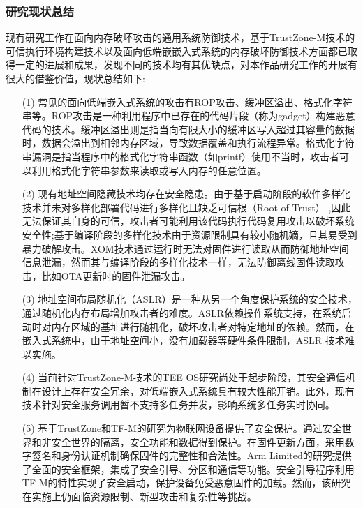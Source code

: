 \documentclass[UTF8,12pt,a4paper,twoside]{ctexart}
\numberwithin{figure}{section}
\begin{document}
\subsubsection{研究现状总结}
\par 现有研究工作在面向内存破坏攻击的通用系统防御技术，基于TrustZone-M技术的可信执行环境构建技术以及面向低端嵌嵌入式系统的内存破坏防御技术方面都已取得一定的进展和成果，发现不同的技术均有其优缺点，对本作品研究工作的开展有很大的借鉴价值，现状总结如下:
\begin{itemize}
    \item[(1)]常见的面向低端嵌入式系统的攻击有ROP攻击、缓冲区溢出、格式化字符串等。ROP攻击是一种利用程序中已存在的代码片段（称为gadget）构建恶意代码的技术。缓冲区溢出则是指当向有限大小的缓冲区写入超过其容量的数据时，数据会溢出到相邻内存区域，导致数据覆盖和执行流程异常。格式化字符串漏洞是指当程序中的格式化字符串函数（如printf）使用不当时，攻击者可以利用格式化字符串参数来读取或写入内存的任意位置。
    \item[(2)] 现有地址空间隐藏技术均存在安全隐患。由于基于启动阶段的软件多样化技术并未对多样化部署代码进行多样化且缺乏可信根（Root of Trust） ,因此无法保证其自身的可信，攻击者可能利用该代码执行代码复用攻击以破坏系统安全性;基于编译阶段的多样化技术由于资源限制具有较小随机嫡，且其易受到暴力破解攻击。XOM技术通过运行时无法对固件进行读取从而防御地址空间信息泄漏，然而其与编译阶段的多样化技术一样，无法防御离线固件读取攻击，比如OTA更新时的固件泄漏攻击。
    \item[(3)] 地址空间布局随机化（ASLR）是一种从另一个角度保护系统的安全技术，通过随机化内存布局增加攻击者的难度。ASLR依赖操作系统支持，在系统启动时对内存区域的基址进行随机化，破坏攻击者对特定地址的依赖。然而，在嵌入式系统中，由于地址空间小，没有加载器等硬件条件限制，ASLR 技术难以实施。
    \item[(4)] 当前针对TrustZone-M技术的TEE OS研究尚处于起步阶段，其安全通信机制在设计上存在安全冗余，对低端嵌入式系统具有较大性能开销。此外，现有技术针对安全服务调用暂不支持多任务并发，影响系统多任务实时协同。
    \item[(5)] 基于TrustZone和TF-M的研究为物联网设备提供了安全保护。通过安全世界和非安全世界的隔离，安全功能和数据得到保护。在固件更新方面，采用数字签名和身份认证机制确保固件的完整性和合法性。Arm Limited的研究提供了全面的安全框架，集成了安全引导、分区和通信等功能。安全引导程序利用TF-M的特性实现了安全启动，保护设备免受恶意固件的加载。然而，该研究在实施上仍面临资源限制、新型攻击和复杂性等挑战。
\end{itemize}
\end{document}
